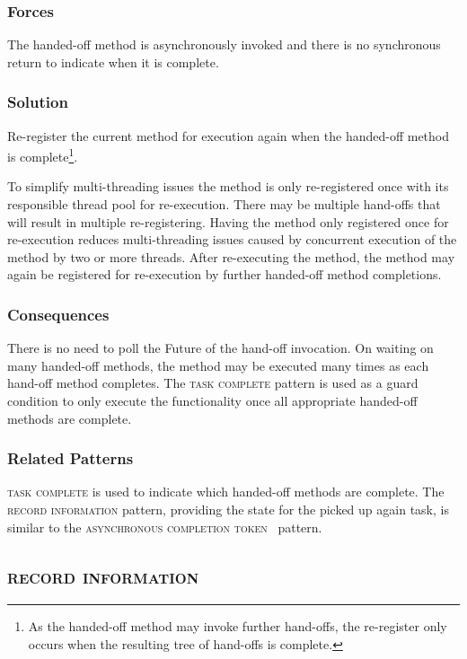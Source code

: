\documentclass[prodmode]{style/acmlarge}
\begin{document}
\subsubsection*{Forces} The handed-off method is asynchronously invoked and there is
no synchronous return to indicate when it is complete.

\subsubsection*{\textbf{Solution}} Re-register the current method for execution again
when the handed-off method is complete\footnote{As the handed-off method may
invoke further hand-offs, the re-register only occurs when the resulting tree of
hand-offs is complete.}.

To simplify multi-threading issues the method is only re-registered once with
its responsible thread pool for re-execution.  There may be multiple hand-offs
that will result in multiple re-registering.  Having the method only registered
once for re-execution reduces multi-threading issues caused by concurrent
execution of the method by two or more threads.  After re-executing the method,
the method may again be registered for re-execution by further handed-off method
completions.

\subsubsection*{Consequences} There is no need to poll the Future of the
hand-off invocation.  On waiting on many handed-off methods, the method may be
executed many times as each hand-off method completes.  The \textsc{task
complete} pattern is used as a guard condition to only execute the functionality
once all appropriate handed-off methods are complete.

\subsubsection*{Related Patterns} \textsc{task complete} is used to indicate
which handed-off methods are complete.  The \textsc{record information} pattern,
providing the state for the picked up again task, is similar to the
\textsc{asynchronous completion token}~\cite{posa} pattern.



\subsection{\textsc{\textbf{record information}}}
\end{document}
